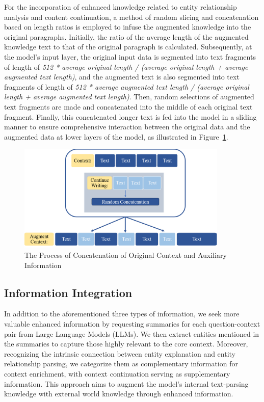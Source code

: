 For the incorporation of enhanced knowledge related to entity relationship analysis and content continuation, a method of random slicing and concatenation based on length ratios is employed to infuse the augmented knowledge into the original paragraphs. Initially, the ratio of the average length of the augmented knowledge text to that of the original paragraph is calculated. Subsequently, at the model's input layer, the original input data is segmented into text fragments of length of \textit{512 * average original length / (average original length + average augmented text length)}, and the augmented text is also segmented into text fragments of length of  \textit{512 * average augmented text length / (average original length + average augmented text length)}. Then, random selections of augmented text fragments are made and concatenated into the middle of each original text fragment. Finally, this concatenated longer text is fed into the model in a sliding manner to ensure comprehensive interaction between the original data and the augmented data at lower layers of the model, as illustrated in Figure~\ref{fig:random_concatenate}.



\begin{figure}[h]
	\centering
	\includegraphics[width=10cm]{RandomConcat.png}
	\caption{The Process of Concatenation of Original Context and Auxiliary Information}
	\label{fig:random_concatenate}
\end{figure}  

\subsection{Information Integration}
\label{sec:information_integration}
In addition to the aforementioned three types of information, we seek more valuable enhanced information by requesting summaries for each question-context pair from Large Language Models (LLMs). We then extract entities mentioned in the summaries to capture those highly relevant to the core context. Moreover, recognizing the intrinsic connection between entity explanation and entity relationship parsing, we categorize them as complementary information for context enrichment, with context continuation serving as supplementary information. This approach aims to augment the model's internal text-parsing knowledge with external world knowledge through enhanced information. 

